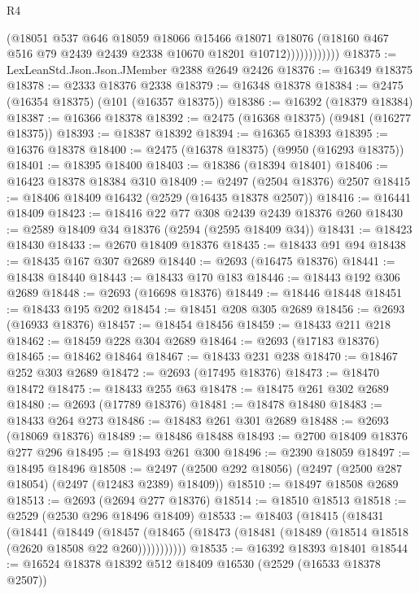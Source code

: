 \begin{lexlean}{R4}
\begin{coremodule}
                        (@18051
                          @537
                          @646
                          @18059
                          @18066
                          @15466
                          @18071
                          @18076
                          (@18160 @467 @516 @79 @2439 @2439 @2338 @10670 @18201 @10712))))))))))))
@18375 := LexLeanStd.Json.Json.JMember @2388 @2649 @2426
@18376 := @16349 @18375
@18378 := @2333 @18376 @2338
@18379 := @16348 @18378
@18384 := @2475 (@16354 @18375) (@101 (@16357 @18375))
@18386 := @16392 (@18379 @18384)
@18387 := @16366 @18378
@18392 := @2475 (@16368 @18375) (@9481 (@16277 @18375))
@18393 := @18387 @18392
@18394 := @16365 @18393
@18395 := @16376 @18378
@18400 := @2475 (@16378 @18375) (@9950 (@16293 @18375))
@18401 := @18395 @18400
@18403 := @18386 (@18394 @18401)
@18406 := @16423 @18378 @18384 @310
@18409 := @2497 (@2504 @18376) @2507
@18415 := @18406 @18409 @16432 (@2529 (@16435 @18378 @2507))
@18416 := @16441 @18409
@18423 := @18416 @22 @77 @308 @2439 @2439 @18376 @260
@18430 := @2589 @18409 @34 @18376 (@2594 (@2595 @18409 @34))
@18431 := @18423 @18430
@18433 := @2670 @18409 @18376
@18435 := @18433 @91 @94
@18438 := @18435 @167 @307 @2689
@18440 := @2693 (@16475 @18376)
@18441 := @18438 @18440
@18443 := @18433 @170 @183
@18446 := @18443 @192 @306 @2689
@18448 := @2693 (@16698 @18376)
@18449 := @18446 @18448
@18451 := @18433 @195 @202
@18454 := @18451 @208 @305 @2689
@18456 := @2693 (@16933 @18376)
@18457 := @18454 @18456
@18459 := @18433 @211 @218
@18462 := @18459 @228 @304 @2689
@18464 := @2693 (@17183 @18376)
@18465 := @18462 @18464
@18467 := @18433 @231 @238
@18470 := @18467 @252 @303 @2689
@18472 := @2693 (@17495 @18376)
@18473 := @18470 @18472
@18475 := @18433 @255 @63
@18478 := @18475 @261 @302 @2689
@18480 := @2693 (@17789 @18376)
@18481 := @18478 @18480
@18483 := @18433 @264 @273
@18486 := @18483 @261 @301 @2689
@18488 := @2693 (@18069 @18376)
@18489 := @18486 @18488
@18493 := @2700 @18409 @18376 @277 @296
@18495 := @18493 @261 @300
@18496 := @2390 @18059
@18497 := @18495 @18496
@18508 := @2497 (@2500 @292 @18056) (@2497 (@2500 @287 @18054) (@2497 (@12483 @2389) @18409))
@18510 := @18497 @18508 @2689
@18513 := @2693 (@2694 @277 @18376)
@18514 := @18510 @18513
@18518 := @2529 (@2530 @296 @18496 @18409)
@18533 := @18403
    (@18415
      (@18431
        (@18441
          (@18449
            (@18457 (@18465 (@18473 (@18481 (@18489 (@18514 @18518 (@2620 @18508 @22 @260)))))))))))
@18535 := @16392 @18393 @18401
@18544 := @16524 @18378 @18392 @512 @18409 @16530 (@2529 (@16533 @18378 @2507))

\end{coremodule}
\end{lexlean}
